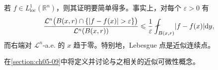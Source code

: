 \documentclass[../../main.tex]{subfiles}%
\begin{document}
\begin{remark}\label{remark:ch01-thm-1-37-局部可和情形}
若 $f\in L^{1}_{\mathrm{loc}}(\mathbb{R}^n)$，则其证明要简单得多。事实上，对每个 $\varepsilon>0$ 有
\begin{align*}
\frac{\mathcal{L}^{n}\bigl(B(x,r)\cap\{\lvert f-f(x)\rvert>\varepsilon\}\bigr)}{\mathcal{L}^{n}(B(x,r))}
\leqslant\frac{1}{\varepsilon}\fint_{B(x,r)}\lvert f-f(x)\rvert\diff y ,
\end{align*}
而右端对 $\mathcal{L}^{n}$-a.e. 的 $x$ 趋于零。特别地，Lebesgue 点是近似连续点。
\end{remark}

在\cref{section:ch05-09}中将定义并讨论与之相关的近似可微性概念。%
\end{document}
